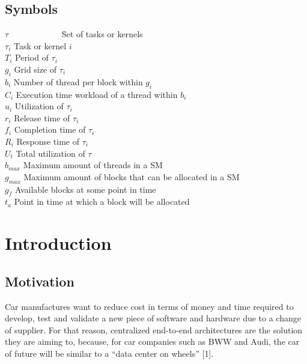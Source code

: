 \documentclass[
  12pt,
  a4paperpaper,
]{report}
\begin{document}
\hypertarget{symbols}{%
\section*{Symbols}\label{symbols}}

\begin{tabbing}
$\tau$~~~~~~~~~~~~ \= Set of tasks or kernels \\
$\tau_i$ \> Task or kernel $i$\\
$T_i$ \> Period of $\tau_i$ \\
$g_i$ \> Grid size of $\tau_i$ \\
$b_i$ \> Number of thread per block within $g_i$ \\
$C_i$ \> Execution time workload of a thread within $b_i$ \\
$u_i$ \> Utilization of $\tau_i$ \\
$r_i$ \> Release time of $\tau_i$ \\
$f_i$ \> Completion time of $\tau_i$ \\
$R_i$ \> Response time of $\tau_i$ \\
$U_t$ \> Total utilization of $\tau$ \\
$b_{max}$ \> Maximum amount of threads in a SM \\
$g_{max}$ \> Maximum amount of blocks that can be allocated in a SM \\
$g_f$ \> Available blocks at some point in time \\
$t_a$ \> Point in time at which a block will be allocated \\
\end{tabbing}

\newpage
\setcounter{page}{1}
\renewcommand{\thepage}{\arabic{page}}

\hypertarget{introduction}{%
\chapter{Introduction}\label{introduction}}

\hypertarget{motivation}{%
\section{Motivation}\label{motivation}}

Car manufactures want to reduce cost in terms of money and time required
to develop, test and validate a new piece of software and hardware due to a change of
supplier. For that reason, centralized end-to-end architectures are the
solution they are aiming to, because, for car companies such as BWW and
Audi, the car of future will be similar to a ``data center on wheels''
{[}1{]}.
\end{document}
